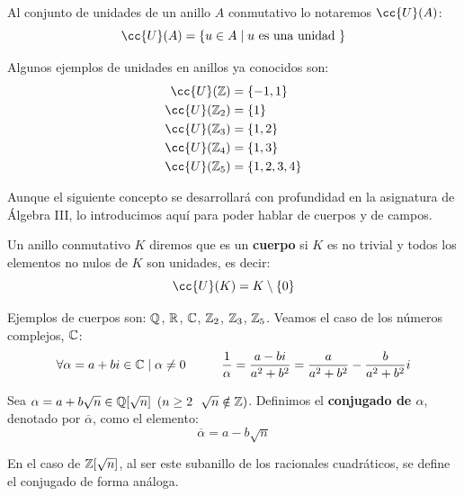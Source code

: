 \begin{notacion}
Al conjunto de unidades de un anillo $A$ conmutativo lo notaremos $\cc{U}(A)$:
$$\cc{U}(A) = \{u \in A \mid u \mbox{ es una unidad }\}$$
\end{notacion}

\begin{ejemplo}
Algunos ejemplos de unidades en anillos ya conocidos son:
\begin{align*}
    \cc{U}(\Z) &= \{-1, 1\} \\
    \cc{U}(\Z_2) &= \{1\} \\
    \cc{U}(\Z_3) &= \{1,2\} \\
    \cc{U}(\Z_4) &= \{1, 3\} \\
    \cc{U}(\Z_5) &= \{1, 2, 3, 4\}
\end{align*}
\end{ejemplo}

Aunque el siguiente concepto se desarrollará con profundidad en la asignatura de Álgebra III, lo introducimos aquí para poder hablar de cuerpos y de campos.
\begin{definicion}[Cuerpo]
    Un anillo conmutativo $K$ diremos que es un \textbf{cuerpo} si $K$ es no trivial y todos los elementos no nulos
    de $K$ son unidades, es decir:
    $$\cc{U}(K) = K \setminus \{0\}$$
\end{definicion}

\begin{ejemplo}
    Ejemplos de cuerpos son: $\mathbb Q$, $\mathbb R$, $\mathbb C$, $\mathbb Z_2$, $\mathbb Z_3$, $\mathbb Z_5$. Veamos el caso de los números complejos, $\mathbb C$:
    $$\forall \alpha = a+bi \in \mathbb C \mid \alpha \neq 0 \hspace{1cm} \dfrac{1}{\alpha} = \dfrac{a-bi}{a^2+b^2} = \dfrac{a}{a^2+b^2} -
        \dfrac{b}{a^2+b^2}i$$
\end{ejemplo}

\begin{definicion}[Conjugado]
    Sea $\alpha= a+b \sqrt{n} \in \mathbb Q[\sqrt{n}]$ $(n \geq 2~~\sqrt{n}\notin \mathbb Z)$. Definimos el \textbf{conjugado de $\alpha$}, denotado por $\overline{\alpha}$, como el elemento:
    $$\overline{\alpha} = a - b\sqrt{n}$$
\end{definicion}

En el caso de $\mathbb Z[\sqrt{n}]$, al ser este subanillo de los racionales cuadráticos, se define el conjugado de forma análoga.\\

